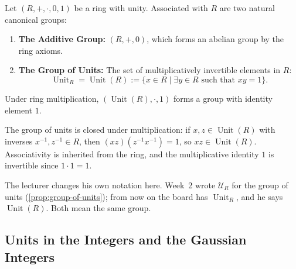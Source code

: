 \begin{content}

Let $(R, +, \cdot, 0, 1)$ be a ring with unity. Associated with $R$ are two natural canonical groups:
\begin{enumerate}[label=\textbf{(\arabic*)}]
    \item \textbf{The Additive Group:} $(R, +, 0)$, which forms an abelian group by the ring axioms.
    \item \textbf{The Group of Units:} The set of multiplicatively invertible elements in $R$:
    \begin{equation}\label{eq:unit-group-def-w3}
    \operatorname{Unit}_R = \operatorname{Unit}(R) := \{ x \in R \mid \exists y \in R \text{ such that } xy = 1 \}.
    \end{equation}
\end{enumerate}

Under ring multiplication, $(\operatorname{Unit}(R), \cdot, 1)$ forms a group with identity element $1$.

\begin{steps}
The group of units is closed under multiplication: if $x, z \in \operatorname{Unit}(R)$ with inverses $x^{-1}, z^{-1} \in R$, then $(xz)(z^{-1}x^{-1}) = 1$, so $xz \in \operatorname{Unit}(R)$. Associativity is inherited from the ring, and the multiplicative identity $1$ is invertible since $1 \cdot 1 = 1$.
\end{steps}
\end{content}

\begin{aiNote}
The lecturer changes his own notation here. Week~2 wrote $\mathcal{U}_R$ for the group of units (\cref{prop:group-of-units}); from now on the board has $\operatorname{Unit}_R$, and he says $\operatorname{Unit}(R)$. Both mean the same group.
\end{aiNote}

\subsection{Units in the Integers and the Gaussian Integers}

